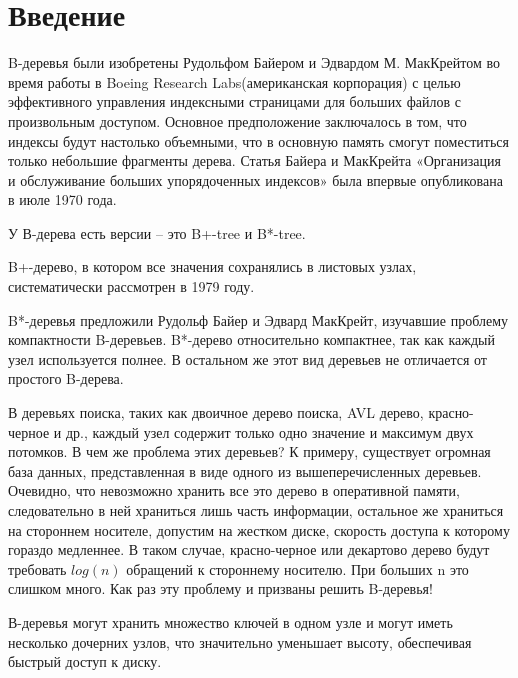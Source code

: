 
\section{Введение}
        
    \par B-деревья были изобретены Рудольфом Байером и Эдвардом М. МакКрейтом во время работы в Boeing Research Labs(американская корпорация)  с целью эффективного управления индексными страницами для больших файлов с произвольным доступом. Основное предположение заключалось в том, что индексы будут настолько объемными, что в основную память смогут поместиться только небольшие фрагменты дерева. Статья Байера и МакКрейта «Организация и обслуживание больших упорядоченных индексов» была впервые опубликована в июле 1970 года.
    \par У В-дерева есть версии – это B+-tree и B*-tree.
    \par B+-дерево, в котором все значения сохранялись в листовых узлах, систематически рассмотрен в 1979 году.
    \par B*-деревья предложили Рудольф Байер и Эдвард МакКрейт, изучавшие проблему компактности B-деревьев. B*-дерево относительно компактнее, так как каждый узел используется полнее. В остальном же этот вид деревьев не отличается от простого B-дерева. 
    \par В деревьях поиска, таких как двоичное дерево поиска, AVL дерево, красно-черное и др., каждый узел содержит только одно значение и максимум двух потомков. В чем же проблема этих деревьев? К примеру, существует огромная база данных, представленная в виде одного из вышеперечисленных деревьев. Очевидно, что невозможно хранить все это дерево в оперативной памяти, следовательно в ней храниться лишь часть информации, остальное же храниться на стороннем носителе, допустим на жестком диске, скорость доступа к которому гораздо медленнее. В таком случае, красно-черное или декартово дерево будут требовать \(log(n)\) обращений к стороннему носителю. При больших n это слишком много. Как раз эту проблему и призваны решить B-деревья! 
    \par В-деревья могут хранить множество ключей в одном узле и могут иметь несколько дочерних узлов, что значительно уменьшает высоту, обеспечивая быстрый доступ к диску.
    \newpage
    
